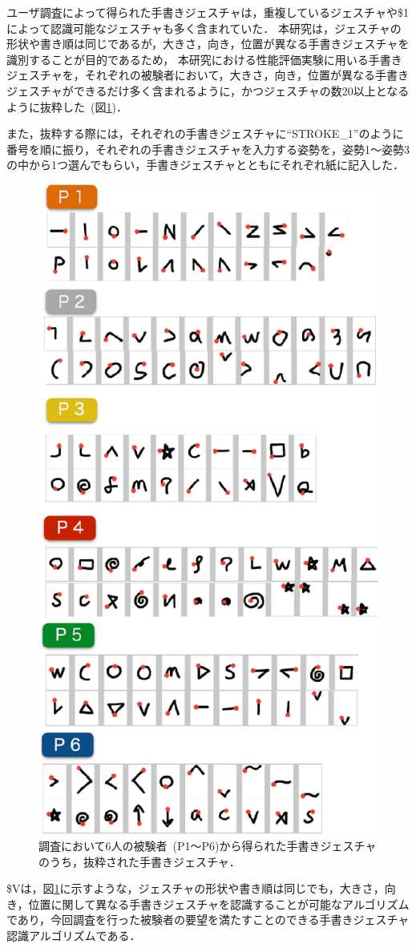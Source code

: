 ユーザ調査によって得られた手書きジェスチャは，重複しているジェスチャや\$1によって認識可能なジェスチャも多く含まれていた．
本研究は，ジェスチャの形状や書き順は同じであるが，大きさ，向き，位置が異なる手書きジェスチャを識別することが目的であるため，
本研究における性能評価実験に用いる手書きジェスチャを，それぞれの被験者において，大きさ，向き，位置が異なる手書きジェスチャができるだけ多く含まれるように，かつジェスチャの数20以上となるように抜粋した~(図\ref{fig:elicetated_strokes})．

また，抜粋する際には，それぞれの手書きジェスチャに``STROKE\_1''のように番号を順に振り，それぞれの手書きジェスチャを入力する姿勢を，姿勢1〜姿勢3の中から1つ選んでもらい，手書きジェスチャとともにそれぞれ紙に記入した．

\begin{figure} [t]
 \begin{center}
  \includegraphics [width=0.7\columnwidth]{img/elicitated_strokes.eps}
  \caption{調査において6人の被験者~(P1〜P6)から得られた手書きジェスチャのうち，抜粋された手書きジェスチャ．}
  \label{fig:elicetated_strokes}
 \end{center}
\end{figure}

\$Vは，図\ref{fig:elicetated_strokes}に示すような，ジェスチャの形状や書き順は同じでも，大きさ，向き，位置に関して異なる手書きジェスチャを認識することが可能なアルゴリズムであり，今回調査を行った被験者の要望を満たすことのできる手書きジェスチャ認識アルゴリズムである．






